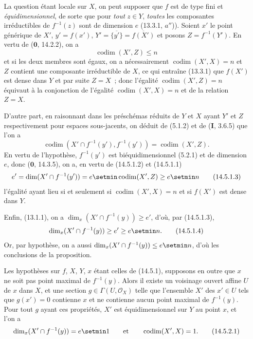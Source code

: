 La question étant locale sur $X$, on peut supposer que $f$ est de type fini et
\emph{équidimensionnel}, de sorte que pour \emph{tout} $z\in Y$, \emph{toutes} les
composantes irréductibles de $f^{-1}(z)$ sont de dimension $e$ (13.3.1, $a''$)).
Soient $x'$ le point générique de $X'$, $y'=f(x')$,
$Y'=\overline{\{y'\}}=\overline{f(X')}$ et posons $Z=f^{-1}(Y')$. En vertu de
($\mathbf 0$, 14.2.2), on a
\begin{equation}
  \operatorname{codim}(X',Z)\leq n
  \tag{14.5.1.1}\label{IV.14.5.1.1-fr}
\end{equation}
et si les deux membres sont égaux, on a nécessairement $\operatorname{codim}(X',X)=n$ et $Z$
contient une composante irréductible de $X$, ce qui entraîne (13.3.1) que
$f(X')$ est dense dans $Y$ et par suite $Z=X$~; donc l'égalité
$\operatorname{codim}(X',Z)=n$ équivaut à la conjonction de l'égalité $\operatorname{codim}(X',X)=n$ et de
la relation $Z=X$.

D'autre part, en raisonnant dans les préschémas réduits de $Y$ et $X$ ayant $Y'$
et $Z$ respectivement pour espaces sous-jacents, on déduit de (5.1.2) et de
(\textbf{I}, 3.6.5) que l'on a
\begin{equation}
  \operatorname{codim}(X'\cap f^{-1}(y'),f^{-1}(y'))=\operatorname{codim}(X',Z).
  \tag{14.5.1.2}\label{IV.14.5.1.2-fr}
\end{equation}
En vertu de l'hypothèse, $f^{-1}(y')$ est biéquidimensionnel (5.2.1) et de
dimension $e$, donc ($\mathbf 0$, 14.3.5), on a, en vertu de (14.5.1.2) et
(14.5.1.1)
\begin{equation}
  e'=\dim(X'\cap f^{-1}(y'))=e\setmin\operatorname{codim}(X',Z)\geq e\setmin n
  \tag{14.5.1.3}\label{IV.14.5.1.3-fr}
\end{equation}
l'égalité ayant lieu si et seulement si $\operatorname{codim}(X',X)=n$ et si $f(X')$ est dense
dans $Y$.

Enfin, (13.1.1), on a $\dim_x(X'\cap f^{-1}(y))\geq e'$, d'où, par
(14.5.1.3),
\begin{equation}
  \dim_x(X'\cap f^{-1}(y))\geq e'\geq e\setmin n.
  \tag{14.5.1.4}\label{IV.14.5.1.4-fr}
\end{equation}
Or, par hypothèse, on a aussi $\dim_x(X'\cap f^{-1}(y))\leq e\setmin n$, d'où les
conclusions de la proposition.

\begin{corollary}[14.5.2]
\label{IV.14.5.2-fr}
Les hypothèses sur $f$, $X$, $Y$, $x$ étant celles de \textup{(14.5.1)}, supposons en
outre que $x$ ne soit pas point maximal de $f^{-1}(y)$. Alors il existe un
voisinage ouvert affine $U$ de $x$ dans $X$, et une section
$g\in\Gamma(U,\mathcal O_X)$ telle que l'ensemble $X'$ des $x'\in U$ tels que
$g(x')=0$ contienne $x$ et ne contienne aucun point maximal de $f^{-1}(y)$. Pour
tout $g$ ayant ces propriétés, $X'$ est équidimensionnel sur $Y$ au point $x$, et
l'on a
\begin{equation}
  \dim_x(X'\cap f^{-1}(y))=e\setmin 1 \qquad\text{et}\qquad \operatorname{codim}(X',X)=1.
  \tag{14.5.2.1}\label{IV.14.5.2.1-fr}
\end{equation}
\end{corollary}


